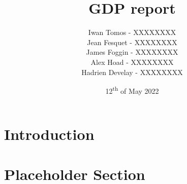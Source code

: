 \documentclass{article}
\title{GDP report}
\author{
    Iwan Tomos - XXXXXXXX\\
    Jean Fesquet - XXXXXXXX\\
    James Foggin - XXXXXXXX\\
    Alex Hoad - XXXXXXXX\\
    Hadrien Develay - XXXXXXXX
}
\date{12\textsuperscript{th} of May 2022}
\begin{document}
\maketitle

\section{Introduction}


\section{Placeholder Section}

\end{document}
